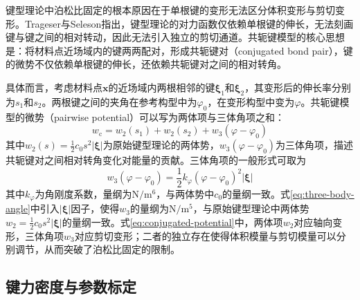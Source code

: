 键型理论中泊松比固定的根本原因在于单根键的变形无法区分体积变形与剪切变形。Trageser与Seleson\cite{TrageserSeleson2020}指出，键型理论的对力函数仅依赖单根键的伸长，无法刻画键与键之间的相对转动，因此无法引入独立的剪切通道。共轭键模型的核心思想是：将材料点近场域内的键两两配对，形成共轭键对（conjugated bond pair），键的微势不仅依赖单根键的伸长，还依赖共轭键对之间的相对转角。

具体而言，考虑材料点$\mathbf{x}$的近场域内两根相邻的键$\boldsymbol{\xi}_{1}$和$\boldsymbol{\xi}_{2}$，其变形后的伸长率分别为$s_{1}$和$s_{2}$。两根键之间的夹角在参考构型中为$\varphi_{0}$，在变形构型中变为$\varphi$。共轭键模型的微势（pairwise potential）可以写为两体项与三体角项之和：
\begin{equation}
  w_{\mathrm{c}}=w_{2}(s_{1})+w_{2}(s_{2})+w_{3}(\varphi-\varphi_{0})
  \label{eq:conjugated-potential}
\end{equation}
其中$w_{2}(s)=\tfrac{1}{2}c_{0}s^{2}|\boldsymbol{\xi}|$为原始键型理论的两体势，$w_{3}(\varphi-\varphi_{0})$为三体角项，描述共轭键对之间相对转角变化对能量的贡献。三体角项的一般形式可取为
\begin{equation}
  w_{3}(\varphi-\varphi_{0})=\frac{1}{2}k_{\varphi}(\varphi-\varphi_{0})^{2}|\boldsymbol{\xi}|
  \label{eq:three-body-angle}
\end{equation}
其中$k_{\varphi}$为角刚度系数，量纲为$\mathrm{N}/\mathrm{m}^{6}$，与两体势中$c_{0}$的量纲一致。式\eqref{eq:three-body-angle}中引入$|\boldsymbol{\xi}|$因子，使得$w_{3}$的量纲为$\mathrm{N}/\mathrm{m}^{5}$，与原始键型理论中两体势$w_{2}=\tfrac{1}{2}c_{0}s^{2}|\boldsymbol{\xi}|$的量纲一致。式\eqref{eq:conjugated-potential}中，两体项$w_{2}$对应轴向变形，三体角项$w_{3}$对应剪切变形；二者的独立存在使得体积模量与剪切模量可以分别调节，从而突破了泊松比固定的限制。


\subsection{键力密度与参数标定}\label{sec:conjugated-force}

